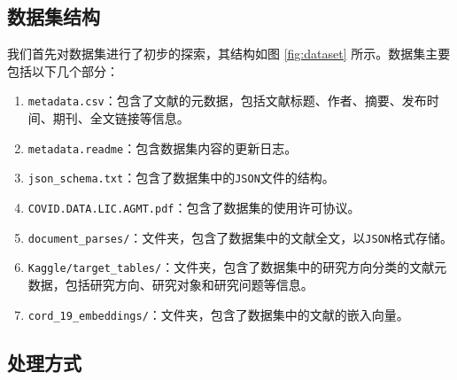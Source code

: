 \documentclass[UTF8,openany]{ctexbook}
\begin{document}
\subsection{数据集结构}

我们首先对数据集进行了初步的探索，其结构如图 \ref{fig:dataset} 所示。数据集主要包括以下几个部分：

\begin{enumerate}
    \item \texttt{metadata.csv}：包含了文献的元数据，包括文献标题、作者、摘要、发布时间、期刊、全文链接等信息。
    \item \texttt{metadata.readme}：包含数据集内容的更新日志。
    \item \texttt{json\_schema.txt}：包含了数据集中的\texttt{JSON}文件的结构。
    \item \texttt{COVID.DATA.LIC.AGMT.pdf}：包含了数据集的使用许可协议。
    \item \texttt{document\_parses/}：文件夹，包含了数据集中的文献全文，以\texttt{JSON}格式存储。
    \item \texttt{Kaggle/target\_tables/}：文件夹，包含了数据集中的研究方向分类的文献元数据，包括研究方向、研究对象和研究问题等信息。
    \item \texttt{cord\_19\_embeddings/}：文件夹，包含了数据集中的文献的嵌入向量。

\end{enumerate}




\subsection{处理方式}

\label{sec:dataProcessing}
\end{document}

